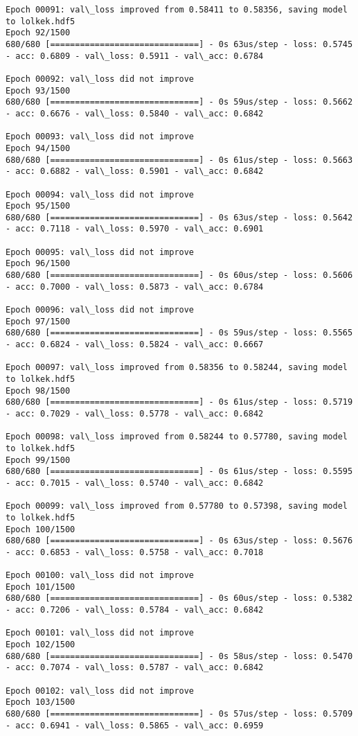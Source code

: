 \documentclass[11pt]{article}
\begin{document}
\begin{Verbatim}[commandchars=\\\{\}]
Epoch 00091: val\_loss improved from 0.58411 to 0.58356, saving model to lolkek.hdf5
Epoch 92/1500
680/680 [==============================] - 0s 63us/step - loss: 0.5745 - acc: 0.6809 - val\_loss: 0.5911 - val\_acc: 0.6784

Epoch 00092: val\_loss did not improve
Epoch 93/1500
680/680 [==============================] - 0s 59us/step - loss: 0.5662 - acc: 0.6676 - val\_loss: 0.5840 - val\_acc: 0.6842

Epoch 00093: val\_loss did not improve
Epoch 94/1500
680/680 [==============================] - 0s 61us/step - loss: 0.5663 - acc: 0.6882 - val\_loss: 0.5901 - val\_acc: 0.6842

Epoch 00094: val\_loss did not improve
Epoch 95/1500
680/680 [==============================] - 0s 63us/step - loss: 0.5642 - acc: 0.7118 - val\_loss: 0.5970 - val\_acc: 0.6901

Epoch 00095: val\_loss did not improve
Epoch 96/1500
680/680 [==============================] - 0s 60us/step - loss: 0.5606 - acc: 0.7000 - val\_loss: 0.5873 - val\_acc: 0.6784

Epoch 00096: val\_loss did not improve
Epoch 97/1500
680/680 [==============================] - 0s 59us/step - loss: 0.5565 - acc: 0.6824 - val\_loss: 0.5824 - val\_acc: 0.6667

Epoch 00097: val\_loss improved from 0.58356 to 0.58244, saving model to lolkek.hdf5
Epoch 98/1500
680/680 [==============================] - 0s 61us/step - loss: 0.5719 - acc: 0.7029 - val\_loss: 0.5778 - val\_acc: 0.6842

Epoch 00098: val\_loss improved from 0.58244 to 0.57780, saving model to lolkek.hdf5
Epoch 99/1500
680/680 [==============================] - 0s 61us/step - loss: 0.5595 - acc: 0.7015 - val\_loss: 0.5740 - val\_acc: 0.6842

Epoch 00099: val\_loss improved from 0.57780 to 0.57398, saving model to lolkek.hdf5
Epoch 100/1500
680/680 [==============================] - 0s 63us/step - loss: 0.5676 - acc: 0.6853 - val\_loss: 0.5758 - val\_acc: 0.7018

Epoch 00100: val\_loss did not improve
Epoch 101/1500
680/680 [==============================] - 0s 60us/step - loss: 0.5382 - acc: 0.7206 - val\_loss: 0.5784 - val\_acc: 0.6842

Epoch 00101: val\_loss did not improve
Epoch 102/1500
680/680 [==============================] - 0s 58us/step - loss: 0.5470 - acc: 0.7074 - val\_loss: 0.5787 - val\_acc: 0.6842

Epoch 00102: val\_loss did not improve
Epoch 103/1500
680/680 [==============================] - 0s 57us/step - loss: 0.5709 - acc: 0.6941 - val\_loss: 0.5865 - val\_acc: 0.6959


\end{Verbatim}
\end{document}
